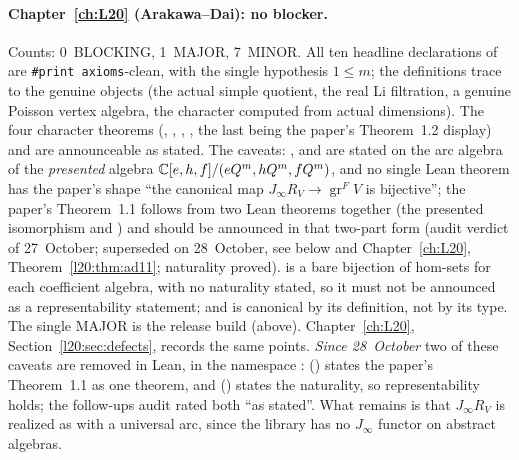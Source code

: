 \paragraph{Chapter~\ref{ch:L20} (Arakawa--Dai): no blocker.} Counts: 0~BLOCKING, 1~MAJOR, 7~MINOR. All ten headline
declarations of  are \texttt{\#print axioms}-clean, with the single
hypothesis $1\le m$; the definitions trace to the genuine objects (the actual simple quotient, the real Li filtration, a
genuine Poisson vertex algebra, the character computed from actual dimensions). The four character theorems
(, , ,
, the last being the paper's Theorem~1.2 display) and
 are announceable as stated. The caveats: ,
 and  are stated on the arc algebra of the \emph{presented} algebra
${\mathbb{C}}[e,h,f]/(eQ^m,hQ^m,fQ^m)$, and no single Lean theorem has the paper's shape ``the canonical map
$J_\infty R_V\to\operatorname{gr}^FV$ is bijective''; the paper's Theorem~1.1 follows from two Lean theorems together
(the presented isomorphism and ) and should be announced in that two-part form (audit verdict of
27~October; superseded on 28~October, see below and Chapter~\ref{ch:L20}, Theorem~\ref{l20:thm:ad11}; naturality proved).
 is a bare bijection of hom-sets for each coefficient algebra, with no naturality stated, so it
must not be announced as a representability statement; and  is canonical by its definition, not by
its type. The single MAJOR is the release build (above). Chapter~\ref{ch:L20}, Section~\ref{l20:sec:defects}, records the
same points. \emph{Since 28~October} two of these caveats are removed in Lean, in the namespace
: 
() states the paper's Theorem~1.1 as one theorem, and
 () states the naturality, so
representability holds; the follow-ups audit rated both ``as stated''. What remains is that $J_\infty R_V$ is realized
as  with a universal arc, since the library has no $J_\infty$ functor on abstract algebras.

